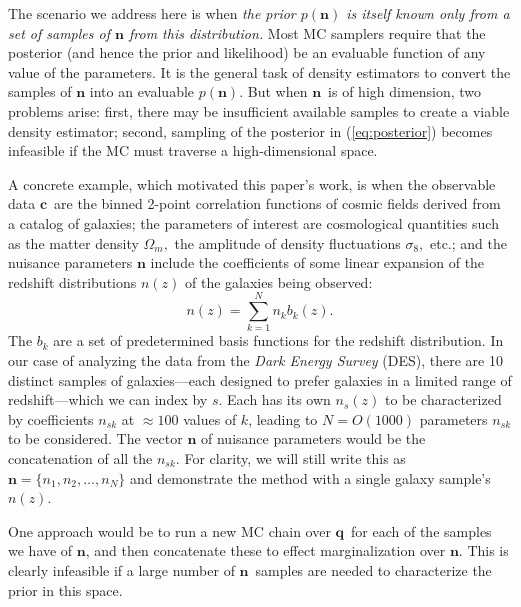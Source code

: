\documentclass[onecolumn]{aastex7}
\newcommand{\vecc}{\ensuremath{\mathbf{c}}}
\newcommand{\vecq}{\ensuremath{\mathbf{q}}}
\newcommand{\vecn}{\ensuremath{\mathbf{n}}}
\begin{document}
The scenario we address here is when \emph{the prior $p(\vecn)$ is
  itself known only from a set of samples of $\vecn$ from this
  distribution.} Most MC samplers require that the posterior (and
hence the prior and likelihood) be an
evaluable function of any value of the parameters. It is the general task of density estimators to convert the samples of $\vecn$ into an evaluable $p(\vecn).$  But when \vecn\ is of high dimension, two problems arise: first, there may be insufficient available samples to create a viable density estimator; second, sampling of the posterior in (\ref{eq:posterior}) becomes infeasible if the MC must traverse a high-dimensional space.

A concrete example, which motivated this paper's work,
is when the observable data \vecc\ are the binned 2-point correlation functions of
cosmic fields derived from a catalog of galaxies; the parameters of
interest are cosmological quantities such as the  matter density
$\Omega_m,$ the amplitude of density fluctuations $\sigma_8,$
etc.; and the nuisance parameters $\vecn$
include the coefficients of some linear expansion of the redshift distributions $n(z)$ of the galaxies being observed:
\begin{equation}
  n(z) = \sum_{k=1}^{N} n_k b_k(z).
  \label{eq:nzbasis}
\end{equation}
The $b_k$ are a set of predetermined basis functions for the redshift
distribution.  In our case of analyzing the data from the  \textit{Dark Energy Survey} (DES), there are 10 distinct samples of galaxies---each designed to prefer galaxies in a limited range of redshift---which we can index by $s.$ Each has its own $n_s(z)$ to be characterized by coefficients $n_{sk}$ at $\approx100$ values of $k$, leading to $N=O(1000)$ parameters $n_{sk}$ to be considered.  The vector $\vecn$ of nuisance parameters would be the concatenation of all the $n_{sk}.$ For clarity, we will still write this as $\vecn=\{n_1,n_2,\ldots,n_N\}$ and demonstrate the method with a single galaxy sample's $n(z)$.

One approach would be to run a new MC chain over \vecq\ for each of the samples we have of \vecn, and then concatenate these to effect marginalization over \vecn.  This is clearly infeasible if a large number of \vecn\ samples are needed to characterize the prior in this space.
\end{document}

